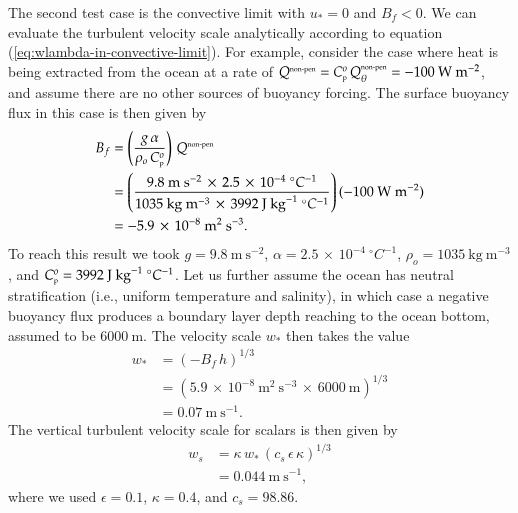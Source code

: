 The second test case is the convective limit with $u_{*}=0$ and $B_{f}
< 0$.  We can evaluate the turbulent velocity scale analytically
according to equation (\ref{eq:wlambda-in-convective-limit}).  For
example, consider the case where heat is being extracted from the
ocean at a rate of $Q^{\mbox{\tiny non-pen}} = C_{\mbox{\tiny p}}^{o}
\, Q_{\theta}^{\mbox{\tiny non-pen}}= -100~\mbox{W}~\mbox{m}^{-2}$,
and assume there are no other sources of buoyancy forcing.  The
surface buoyancy flux in this case is then given by
\begin{subequations}
\begin{align}
 B_{f} &= \left( \frac{g \, \alpha}{\rho_{o} \, C_{\mbox{\tiny p}}^{o} } \right) \, Q^{\mbox{\tiny non-pen}} 
\\
 &= \left( \frac{ 9.8~\mbox{m}~\mbox{s}^{-2} \, \times \, 2.5 \, \times \, 10^{-4}~\mbox{}^{\circ}C^{-1} }
             {1035~\mbox{kg}~\mbox{m}^{-3} \, \times \, 3992~\mbox{J}~\mbox{kg}^{-1}~\mbox{}^{\circ}C^{-1} }
       \right)
       (-100~\mbox{W}~\mbox{m}^{-2})
 \\
 &= -5.9 \, \times \, 10^{-8}~\mbox{m}^{2}~\mbox{s}^{-3}.
\end{align}
\end{subequations}
To reach this result we took $g = 9.8~\mbox{m}~\mbox{s}^{-2}$, $\alpha
= 2.5 \, \times \, 10^{-4}~\mbox{}^{\circ}C^{-1}$, $\rho_{o} =
1035~\mbox{kg}~\mbox{m}^{-3}$, and $C_{\mbox{\tiny p}}^{o} =
3992~\mbox{J}~\mbox{kg}^{-1}~\mbox{}^{\circ}C^{-1}$.  Let us further
assume the ocean has neutral stratification (i.e., uniform temperature
and salinity), in which case a negative buoyancy flux produces a
boundary layer depth reaching to the ocean bottom, assumed to be
$6000~\mbox{m}$.  The velocity scale $w_{*}$ then takes the value 
\begin{subequations}
\begin{align}
  w_{*} &= (-B_{f} \, h)^{1/3}
 \\
  &= (5.9 \, \times \, 10^{-8}~\mbox{m}^{2}~\mbox{s}^{-3} \, \times \, 6000~\mbox{m})^{1/3} 
 \\
 &= 0.07~\mbox{m}~\mbox{s}^{-1}.
\end{align}
\end{subequations}
The vertical turbulent velocity scale for scalars is then given by 
\begin{subequations}
\begin{align}
 w_{s} &= \kappa \, w_{*} \, (c_{s} \, \epsilon \, \kappa)^{1/3}  
 \\ &= 
  0.044~\mbox{m}~\mbox{s}^{-1},
\end{align}
\end{subequations}
 where we used $\epsilon=0.1$, $\kappa=0.4$, and $c_{s} = 98.86$.  



